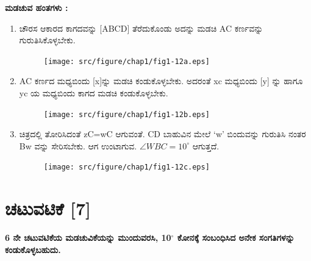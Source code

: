\noindent
\textbf{ಮಡಚುವ ಹಂತಗಳು :}
\begin{enumerate}
\item ಚೌರಸ ಆಕಾರದ ಕಾಗದವನ್ನು [ABCD] ತೆರೆದುಕೊಂಡು ಅದನ್ನು ಮಡಚಿ AC ಕರ್ಣವನ್ನು ಗುರುತಿಸಿಕೊಳ್ಳಬೇಕು. 
\begin{figure}[H]
\centering
\texttt{[image: src/figure/chap1/fig1-12a.eps]}
\end{figure}

\item AC ಕರ್ಣದ ಮಧ್ಯಬಿಂದು [x]ನ್ನು ಮಡಚಿ ಕಂಡುಕೊಳ್ಳಬೇಕು. ಅದರಂತೆ  xc ಮಧ್ಯಬಿಂದು [y] ನ್ನು ಹಾಗೂ  yc ಯ ಮಧ್ಯಬಿಂದು ಕಾಗದ ಮಡಚಿ ಕಂಡು\break ಕೊಳ್ಳಬೇಕು. 
\begin{figure}[H]
\centering
\texttt{[image: src/figure/chap1/fig1-12b.eps]}
\end{figure}

\item ಚಿತ್ರದಲ್ಲಿ ತೋರಿಸಿದಂತೆ zC=wC ಆಗುವಂತೆ. CD ಬಾಹುವಿನ ಮೇಲೆ  `w' ಬಿಂದುವನ್ನು ಗುರುತಿಸಿ ನಂತರ Bw ವನ್ನು ಸೇರಿಸಬೇಕು. ಆಗ ಉಂಟಾಗುವ. $\angle WBC = 10^\circ$ ಆಗುತ್ತದೆ. 
\begin{figure}[H]
\centering
\texttt{[image: src/figure/chap1/fig1-12c.eps]}
\end{figure}
\end{enumerate}

\section*{ಚಟುವಟಿಕೆ [7]}  \textbf{6 ನೇ ಚಟುವಟಿಕೆಯ ಮಡಚುವಿಕೆಯನ್ನು ಮುಂದುವರಸಿ, 10$^\circ$ ಕೋನಕ್ಕೆ ಸಂಬಂಧಿಸಿದ ಅನೇಕ ಸಂಗತಿಗಳನ್ನು ಕಂಡುಕೊಳ್ಳಬಹುದು.} 

